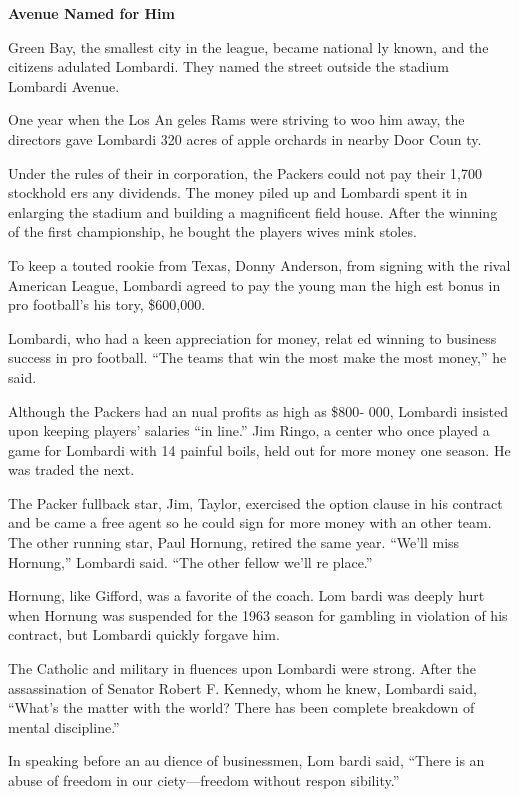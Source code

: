 \textbf{Avenue Named for Him}

Green Bay, the smallest city in the league, became national ly known,
and the citizens adulated Lombardi. They named the street outside the
stadium Lombardi Avenue.

One year when the Los An geles Rams were striving to woo him away, the
directors gave Lombardi 320 acres of apple orchards in nearby Door Coun
ty.

Under the rules of their in corporation, the Packers could not pay their
1,700 stockhold ers any dividends. The money piled up and Lombardi spent
it in enlarging the stadium and building a magnificent field house.
After the winning of the first championship, he bought the players wives
mink stoles.

To keep a touted rookie from Texas, Donny Anderson, from signing with
the rival American League, Lombardi agreed to pay the young man the high
est bonus in pro football's his tory, \$600,000.

Lombardi, who had a keen appreciation for money, relat ed winning to
business success in pro football. ``The teams that win the most make the
most money,'' he said.

Although the Packers had an nual profits as high as \$800‐ 000, Lombardi
insisted upon keeping players' salaries ``in line.'' Jim Ringo, a center
who once played a game for Lombardi with 14 painful boils, held out for
more money one season. He was traded the next.

The Packer fullback star, Jim, Taylor, exercised the option clause in
his contract and be came a free agent so he could sign for more money
with an other team. The other running star, Paul Hornung, retired the
same year. ``We'll miss Hornung,'' Lombardi said. ``The other fellow
we'll re place.''

Hornung, like Gifford, was a favorite of the coach. Lom bardi was deeply
hurt when Hornung was suspended for the 1963 season for gambling in
violation of his contract, but Lombardi quickly forgave him.

The Catholic and military in fluences upon Lombardi were strong. After
the assassination of Senator Robert F. Kennedy, whom he knew, Lombardi
said, ``What's the matter with the world? There has been complete
breakdown of mental discipline.''

In speaking before an au dience of businessmen, Lom bardi said, ``There
is an abuse of freedom in our ciety---freedom without respon sibility.''

